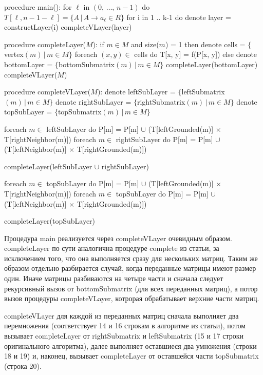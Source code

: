 \documentclass[12pt]{article}  %
\theoremstyle{definition}
\theoremstyle{remark}
\begin{document}
\begin{algorithm}[caption={Algorithm.}, label={main}]
procedure main():
  for $\ell$ in $(0,\,\dots,\,n-1)$ do
    $T[\ell, n-1-\ell] = \{A\,|\,A \to a_{\ell} \in R\}$
  for i in 1 .. k-1 do
    denote layer = constructLayer(i)
    completeVLayer(layer)  

procedure completeLayer($M$):
  if $m \in M$ and size($m$) = 1 then
    denote cells = $\{$vertex$(m)\,|\, m \in M\}$
    foreach $(x, y) \in $ cells do
      T[x, y] = f(P[x, y])
  else
    denote bottomLayer = $\{$bottomSubmatrix$(m)\,|\,m \in M\}$
    completeLayer(bottomLayer)
    completeVLayer($M$)     

procedure completeVLayer($M$):
  denote leftSubLayer = $\{$leftSubmatrix$(m)\,|\,m \in M\}$
  denote rightSubLayer = $\{$rightSubmatrix$(m)\,|\,m \in M\}$
  denote topSubLayer = $\{$topSubmatrix$(m)\,|\,m \in M\}$

  foreach $m \in$ leftSubLayer do
    P[m] = P[m] $\cup$ (T[leftGrounded(m)] $\times$ T[rightNeighbor(m)])
  foreach $m \in$ rightSubLayer do
    P[m] = P[m] $\cup$ (T[leftNeighbor(m)] $\times$ T[rightGrounded(m)])

  completeLayer(leftSubLayer $\cup$ rightSubLayer)

  foreach $m \in$ topSubLayer do
    P[m] = P[m] $\cup$ (T[leftGrounded(m)] $\times$ T[rightNeighbor(m)])
  foreach $m \in$ topSubLayer do
    P[m] = P[m] $\cup$ (T[leftNeighbor(m)] $\times$ T[rightGrounded(m)])

  completeLayer(topSubLayer)  
\end{algorithm}

Процедура main реализуется через completeVLayer очевидным образом. completeLayer по сути аналогична процедуре complete из статьи, за исключением того, что она выполняется сразу для нескольких матриц. Таким же образом отдельно разбирается случай, когда переданные матрицы имеют размер один. Иначе матрицы разбиваются на четыре части и сначала следует рекурсивный вызов от bottomSubmatrix (для всех переданных матриц), а потор вызов процедуры completeVLayer, котрорая обрабатывает верхние части матриц. 

completeVLayer для каждой из переданных матриц сначала выполняет два перемножения (соответствует 14 и 16 строкам в алгоритме из статьи), потом вызывает completeLayer от rightSubmatrix и leftSubmatrix (15 и 17 строки оригинального алгоритма), далее выполняет оставшиеся два умножения (строки 18 и 19) и, наконец, вызывает completeLayer от оставшейся части topSubmatrix (строка 20).
\end{document}
